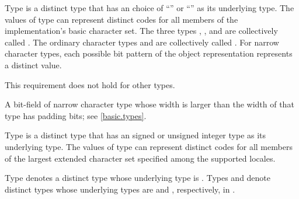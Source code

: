 \pnum
{}%
%
%
%
%
%
%
%
Type  is a distinct type
that has an  choice of
``'' or ``'' as its underlying type.
The values of type  can represent distinct codes
for all members of the implementation's basic character set.
The three types , , and 
are collectively called
.
The ordinary character types and 
are collectively called .
For narrow character types,
each possible bit pattern of the object representation represents
a distinct value.
\begin{note}
This requirement does not hold for other types.
\end{note}
\begin{note}
A bit-field of narrow character type whose width is larger than
the width of that type has padding bits; see \ref{basic.types}.
\end{note}

\pnum
{}%
%
%
Type  is a distinct type that has
an 
signed or unsigned integer type as its underlying type.
The values of type  can represent
distinct codes for all members of the largest extended character set
specified among the supported locales.

\pnum
{}%
%
%
Type  denotes a distinct type
whose underlying type is .
%
%
%
%
%
%
Types  and  denote distinct types
whose underlying types are  and ,
respectively, in .

